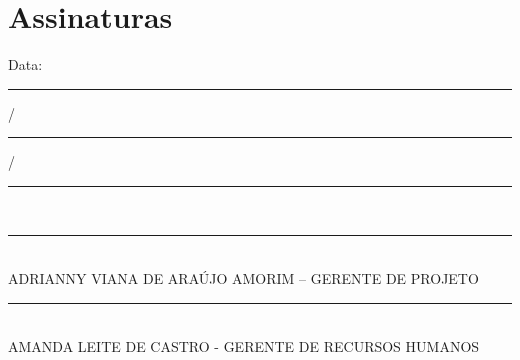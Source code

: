 \section*{Assinaturas}
\begin{center}
Data: \rule{0.5cm}{0.1mm}/\rule{0.5cm}{0.1mm}/\rule{1cm}{0.1mm}     \\
\rule{13cm}{0.1mm}\\
ADRIANNY VIANA DE ARAÚJO AMORIM – GERENTE DE PROJETO\\
\rule{13cm}{0.1mm}\\
AMANDA LEITE DE CASTRO - GERENTE DE RECURSOS HUMANOS

\end{center}
% 